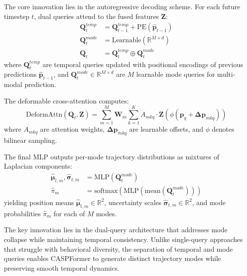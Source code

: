 \begin{description}[leftmargin=1em,itemsep=2pt]
\begin{description}[leftmargin=1em,itemsep=2pt]
\item[Recurrent deformable cross-attention.] The core innovation lies in the autoregressive decoding scheme. For each future timestep \(t\), dual queries attend to the fused features \(\mathbf{Z}\):
\begin{equation}
\label{eq:dual_query_update}
\begin{aligned}
\mathbf{Q}_t^{temp} &= \mathbf{Q}_{t-1}^{temp} + \text{PE}(\hat{\mathbf{p}}_{t-1}) \\
\mathbf{Q}_t^{mode} &= \text{Learnable}(\mathbb{R}^{M \times d}) \\
\mathbf{Q}_t &= \mathbf{Q}_t^{temp} \oplus \mathbf{Q}_t^{mode}
\end{aligned}
\end{equation}
where \(\mathbf{Q}_t^{temp}\) are temporal queries updated with positional encodings of previous predictions \(\hat{\mathbf{p}}_{t-1}\), and \(\mathbf{Q}_t^{mode} \in \mathbb{R}^{M \times d}\) are \(M\) learnable mode queries for multi-modal prediction.

The deformable cross-attention computes:
\begin{equation}
\label{eq:deformable_cross_attention}
\text{DeformAttn}(\mathbf{Q}_t, \mathbf{Z}) = \sum_{m=1}^{M} \mathbf{W}_m \sum_{k=1}^{K} A_{mkq} \cdot \mathbf{Z}(\phi(\mathbf{p}_q + \boldsymbol{\Delta p}_{mkq}))
\end{equation}
where \(A_{mkq}\) are attention weights, \(\boldsymbol{\Delta p}_{mkq}\) are learnable offsets, and \(\phi\) denotes bilinear sampling.

\item[Mixture-density head.] The final MLP outputs per-mode trajectory distributions as mixtures of Laplacian components:
\begin{equation}
\label{eq:mixture_output}
\begin{aligned}
\hat{\boldsymbol{\mu}}_{t,m}, \hat{\boldsymbol{\sigma}}_{t,m} &= \text{MLP}(\mathbf{Q}_t^{mode}) \\
\hat{\pi}_m &= \text{softmax}(\text{MLP}(\text{mean}(\mathbf{Q}_t^{mode})))
\end{aligned}
\end{equation}
yielding position means \(\hat{\boldsymbol{\mu}}_{t,m} \in \mathbb{R}^2\), uncertainty scales \(\hat{\boldsymbol{\sigma}}_{t,m} \in \mathbb{R}^2\), and mode probabilities \(\hat{\pi}_m\) for each of \(M\) modes.
\end{description}

The key innovation lies in the dual-query architecture that addresses mode collapse while maintaining temporal consistency. Unlike single-query approaches that struggle with behavioral diversity, the separation of temporal and mode queries enables CASPFormer to generate distinct trajectory modes while preserving smooth temporal dynamics.


\end{description}
